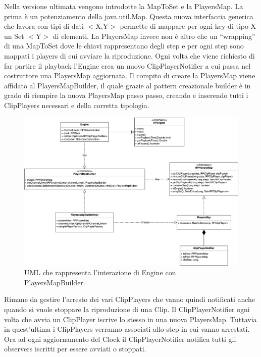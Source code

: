 \documentclass[a4paper,12pt]{report}
\begin{document}
Nella versione ultimata vengono introdotte la MapToSet e la PlayersMap. 
La prima è un potenziamento della java.util.Map. Questa nuova interfaccia generica che lavora con tipi di dati \begin{math}<\end{math}X,Y\begin{math}>\end{math} permette di mappare per ogni key di tipo X un Set \begin{math}<\end{math}Y\begin{math}>\end{math} di elementi.
La PlayersMap invece non è altro che un “wrapping” di una MapToSet dove le chiavi rappresentano degli step e per ogni step sono mappati i players di cui avviare la riproduzione.
Ogni volta che viene richiesto di far partire il playback l’Engine crea un nuovo ClipPlayerNotifier a cui passa nel costruttore una PlayersMap aggiornata.
Il compito di creare la PlayersMap viene affidato al PlayersMapBuilder, il quale grazie al pattern creazionale builder è in grado di riempire la nuova PlayersMap passo passo, creando e inserendo tutti i ClipPlayers necessari e della corretta tipologia.

\begin{figure}[H]
\centering{}
\includegraphics[width=\textwidth]{img/engine.png}
\caption{UML che rappresenta l'interazione di Engine con PlayersMapBuilder.}
\end{figure}

Rimane da gestire l’arresto dei vari ClipPlayers che vanno quindi notificati anche quando si vuole stoppare la riproduzione di una Clip.
Il ClipPlayerNotifier ogni volta che avvia un ClipPlayer iscrive lo stesso in una nuova PlayersMap. Tuttavia in quest’ultima i ClipPlayers verranno associati allo step in cui vanno arrestati.
Ora ad ogni aggiornamento del Clock il ClipPlayerNotifier notifica tutti gli observers iscritti per essere avviati o stoppati.
\end{document}
